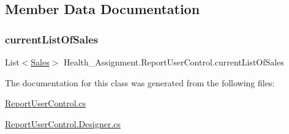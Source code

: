 \subsection{Member Data Documentation}
\mbox{\label{class_health___assignment_1_1_report_user_control_a92c8cdc8c292090768dbfe442f7576ea}} 
\subsubsection{\texorpdfstring{current\+List\+Of\+Sales}{currentListOfSales}}
{\footnotesize\ttfamily List$<$\hyperlink{class_health___assignment_1_1_sales}{Sales}$>$ Health\+\_\+\+Assignment.\+Report\+User\+Control.\+current\+List\+Of\+Sales}



The documentation for this class was generated from the following files\+:\begin{DoxyCompactItemize}
\item 
\hyperlink{_report_user_control_8cs}{Report\+User\+Control.\+cs}\item 
\hyperlink{_report_user_control_8_designer_8cs}{Report\+User\+Control.\+Designer.\+cs}\end{DoxyCompactItemize}
